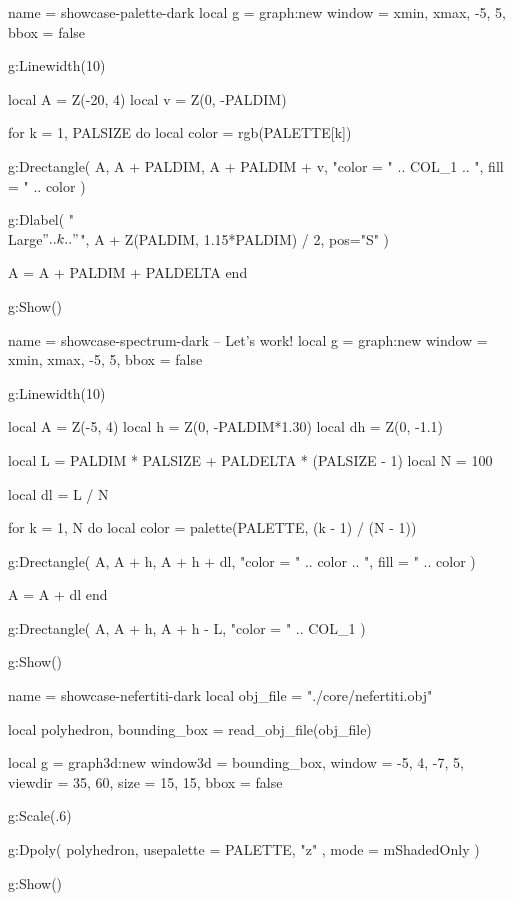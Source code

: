 
\centering

\bigskip

\begin{luadraw}{name = showcase-palette-dark}
local g = graph:new{
  window = {xmin, xmax, -5, 5},
  bbox   = false
}

g:Linewidth(10)

local A = Z(-20, 4)
local v = Z(0, -PALDIM)

for k = 1, PALSIZE do
  local color = rgb(PALETTE[k])

  g:Drectangle(
    A, A + PALDIM, A + PALDIM + v,
    "color = " .. COL_1 .. ", fill = " .. color
  )

  g:Dlabel(
    "\\Large$" .. k .. "$",
    A + Z(PALDIM, 1.15*PALDIM) / 2,
    {pos="S"}
  )

  A = A + PALDIM + PALDELTA
end

g:Show()
\end{luadraw}



\bigskip

\begin{luadraw}{name = showcase-spectrum-dark}
-- Let's work!
local g = graph:new{
  window = {xmin, xmax, -5, 5},
  bbox   = false
}

g:Linewidth(10)

local A  = Z(-5, 4)
local h  = Z(0, -PALDIM*1.30)
local dh = Z(0, -1.1)

local L = PALDIM * PALSIZE + PALDELTA * (PALSIZE - 1)
local N = 100

local dl = L / N

for k = 1, N do
  local color = palette(PALETTE, (k - 1) / (N - 1))

  g:Drectangle(
    A, A + h, A + h + dl,
    "color = " .. color .. ", fill = " .. color
  )

  A = A + dl
end

g:Drectangle(
  A, A + h, A + h - L,
  "color = " .. COL_1
)

g:Show()
\end{luadraw}



\newpage

\begin{luadraw}{name = showcase-nefertiti-dark}
local obj_file = "./core/nefertiti.obj"

local polyhedron, bounding_box = read_obj_file(obj_file)

local g = graph3d:new{
  window3d = bounding_box,
  window   = {-5, 4, -7, 5},
  viewdir  = {35, 60},
  size     = {15, 15},
  bbox     = false
}

g:Scale(.6)

g:Dpoly(
  polyhedron,
  {
    usepalette = {PALETTE, "z" },
    mode       = mShadedOnly
  }
)

g:Show()
\end{luadraw}


